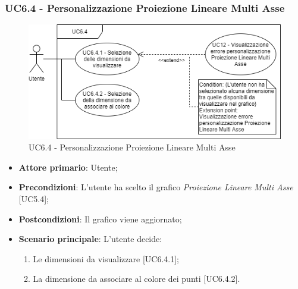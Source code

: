 \subsubsection{UC6.4 - Personalizzazione Proiezione Lineare Multi Asse}
\begin{figure}[h]
\includegraphics[width=\linewidth]{Section/Images/UC6.4.png}
\centering
\caption{UC6.4 - Personalizzazione Proiezione Lineare Multi Asse}
\end{figure}
\begin{itemize}
	\item \textbf{Attore primario}: Utente;
	
	\item \textbf{Precondizioni}: L'utente ha scelto il grafico \textit{Proiezione Lineare Multi Asse} [UC5.4];
	
	\item \textbf{Postcondizioni}: Il grafico viene aggiornato;
	
	\item \textbf{Scenario principale}: L'utente decide:
	
\begin{enumerate}
\item Le dimensioni da visualizzare [UC6.4.1];
\item La dimensione da associare al colore dei punti [UC6.4.2].
\end{enumerate}	
		
\end{itemize}